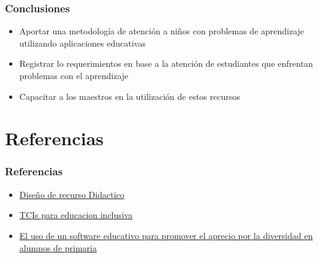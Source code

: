 \documentclass[11pt]{beamer}
\begin{document}
\begin{frame}
    

\frametitle{Conclusiones}
\begin{itemize}
\item Aportar una metodología de atención a niños con problemas de aprendizaje utilizando aplicaciones educativas
\item Registrar lo requerimientos en base a la atención de estudiantes que enfrentan problemas con el aprendizaje
\item Capacitar a los maestros en la utilización de estos recursos
\end{itemize}

\end{frame}

\section{Referencias}
\begin{frame}
\frametitle{Referencias}
\begin{itemize}
\item  \href{https://recursos.portaleducoas.org/sites/default/files/VE14.061.pdf}{Diseño de recurso Didactico}
\item  \href{http://sedici.unlp.edu.ar/bitstream/handle/10915/31833/Documento_completo.pdf?sequence=1&isAllowed=yy}{TCIs para educacion inclusiva}
\item  \href{https://www.redalyc.org/pdf/688/68830444003.pdf}{El uso de un software educativo para promover el aprecio por la diversidad en alumnos de primaria}

\end{itemize}
\end{frame}
\end{document}
